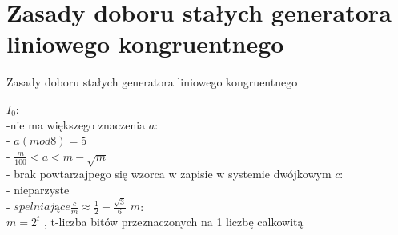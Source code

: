 \section{Zasady doboru stałych generatora liniowego kongruentnego}
	\begin{frame}{Zasady doboru stałych generatora liniowego kongruentnego}
    
 	 $I_{0}$: \\
 	 -nie ma większego znaczenia 
	\newline \newline
	$a$: \\
	- $a(mod 8)=5$ \\
	- $\frac{m}{100}<a<m-\sqrt{m}$ \\
	- brak powtarzajpego się wzorca w zapisie w systemie dwójkowym
	\newline \newline
	$c$: \\
	- nieparzyste \\
 	- $spelniające \frac{c}{m}\approx\frac{1}{2}-\frac{\sqrt{3}}{6}$
	\newline \newline
	$m$: \\
	$m=2^{t}$ , \quad t-liczba bitów przeznaczonych na 1 liczbę calkowitą
	

	\end{frame}